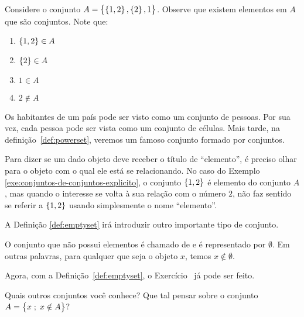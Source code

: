 \begin{example}
\label{exe:conjuntos-de-conjuntos-explicito}
Considere o conjunto $A = \left\{ \left\{ 1,2\right\},\left\{ 2\right\}, 1\right\}$.
    Observe que existem elementos em $A$ que são conjuntos.
    Note que:
    \begin{enumerate}
        \item $\left\{ 1,2\right\} \in A$
        \item $\left\{ 2\right\} \in A$
        \item $1 \in A$
        \item $2 \notin A$
    \end{enumerate}
\end{example}

\begin{example}
\label{exe:conjuntos-de-conjuntos-implicito}
Os habitantes de um país pode ser visto como um conjunto de pessoas.
Por sua vez, cada pessoa pode ser vista como um conjunto de células.
Mais tarde, na definição~\ref{def:powerset}, veremos um famoso conjunto formado por conjuntos.
\end{example}


Para dizer se um dado objeto deve receber o título de ``elemento'', é preciso olhar para o objeto com o qual ele está se relacionando. 
No caso do Exemplo \ref{exe:conjuntos-de-conjuntos-explicito}, o conjunto $\left\{ 1,2\right\}$ é elemento do conjunto $A$, mas quando o interesse se volta à sua relação com o número $2$, não faz sentido se referir a $\left\{ 1,2\right\}$ usando simplesmente o nome ``elemento''.

A Definição \ref{def:emptyset} irá introduzir outro importante tipo de conjunto.

\begin{definition}
\label{def:emptyset}
O conjunto que não possui elementos é chamado de  e é representado por $\emptyset$.
Em outras palavras, para qualquer que seja o objeto $x$, temos $x \notin \emptyset$.
\end{definition}

Agora, com a Definição~\ref{def:emptyset}, o Exercício~ já pode ser feito.

\begin{example}
Quais outros conjuntos você conhece? Que tal pensar sobre o conjunto $A = \left\{ x \;;\; x \notin A\right\}$?
\end{example}

